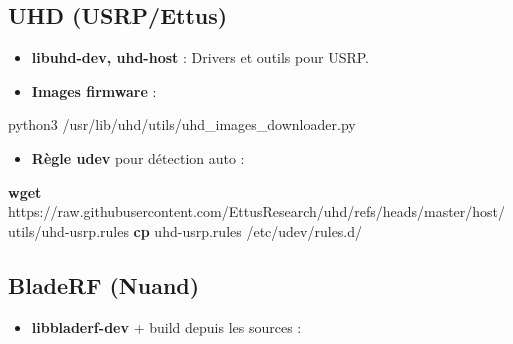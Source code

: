 \documentclass[
]{article}
\newenvironment{Shaded}{\begin{snugshade}}{\end{snugshade}}
\newcommand{\AttributeTok}[1]{\textcolor[rgb]{0.13,0.29,0.53}{#1}}
\newcommand{\BuiltInTok}[1]{#1}
\newcommand{\ExtensionTok}[1]{#1}
\newcommand{\FunctionTok}[1]{\textcolor[rgb]{0.13,0.29,0.53}{\textbf{#1}}}
\newcommand{\KeywordTok}[1]{\textcolor[rgb]{0.13,0.29,0.53}{\textbf{#1}}}
\newcommand{\NormalTok}[1]{#1}
\newcommand{\VariableTok}[1]{\textcolor[rgb]{0.00,0.00,0.00}{#1}}
\providecommand{\tightlist}{%
  \setlength{\itemsep}{0pt}\setlength{\parskip}{0pt}}
\begin{document}
\subsection{UHD (USRP/Ettus)}\label{uhd-usrpettus}

\begin{itemize}
\item
  \textbf{libuhd-dev, uhd-host} : Drivers et outils pour USRP.
\item
  \textbf{Images firmware} :
\end{itemize}

\begin{Shaded}
\begin{Highlighting}[]
\ExtensionTok{python3}\NormalTok{ /usr/lib/uhd/utils/uhd\_images\_downloader.py}
\end{Highlighting}
\end{Shaded}

\begin{itemize}
\tightlist
\item
  \textbf{Règle udev} pour détection auto :
\end{itemize}

\begin{Shaded}
\begin{Highlighting}[]
\FunctionTok{wget}\NormalTok{ https://raw.githubusercontent.com/EttusResearch/uhd/refs/heads/master/host/utils/uhd{-}usrp.rules}
\FunctionTok{cp}\NormalTok{ uhd{-}usrp.rules /etc/udev/rules.d/}
\end{Highlighting}
\end{Shaded}

\subsection{BladeRF (Nuand)}\label{bladerf-nuand}

\begin{itemize}
\tightlist
\item
  \textbf{libbladerf-dev} + build depuis les sources :
\end{itemize}

\begin{Shaded}
\end{Shaded}
\end{document}
